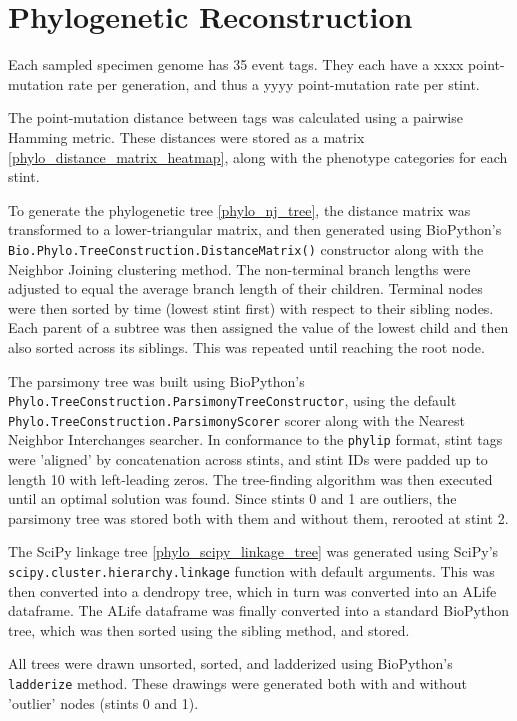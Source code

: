\section{Phylogenetic Reconstruction}

Each sampled specimen genome has 35 event tags.
They each have a xxxx point-mutation rate per generation, and thus a yyyy point-mutation rate per stint.

The point-mutation distance between tags was calculated using a pairwise Hamming metric.
These distances were stored as a matrix \ref{phylo_distance_matrix_heatmap}, along with the phenotype categories for each stint.

To generate the phylogenetic tree \ref{phylo_nj_tree}, the distance matrix was transformed to a lower-triangular matrix, and then generated using BioPython's \texttt{Bio.Phylo.TreeConstruction.DistanceMatrix()} constructor along with the Neighbor Joining clustering method.
The non-terminal branch lengths were adjusted to equal the average branch length of their children.
Terminal nodes were then sorted by time (lowest stint first) with respect to their sibling nodes.
Each parent of a subtree was then assigned the value of the lowest child and then also sorted across its siblings.
This was repeated until reaching the root node.

The parsimony tree was built using BioPython's \texttt{Phylo.TreeConstruction.ParsimonyTreeConstructor}, using the default \texttt{Phylo.TreeConstruction.ParsimonyScorer} scorer along with the Nearest Neighbor Interchanges searcher.
In conformance to the \texttt{phylip} format, stint tags were 'aligned' by concatenation across stints, and stint IDs were padded up to length 10 with left-leading zeros.
The tree-finding algorithm was then executed until an optimal solution was found.
Since stints 0 and 1 are outliers, the parsimony tree was stored both with them and without them, rerooted at stint 2.

The SciPy linkage tree \ref{phylo_scipy_linkage_tree} was generated using SciPy's \texttt{scipy.cluster.hierarchy.linkage} function with default arguments.
This was then converted into a dendropy tree, which in turn was converted into an ALife dataframe.
The ALife dataframe was finally converted into a standard BioPython tree, which was then sorted using the sibling method, and stored.

All trees were drawn unsorted, sorted, and ladderized using BioPython's \texttt{ladderize} method.
These drawings were generated both with and without 'outlier' nodes (stints 0 and 1).






